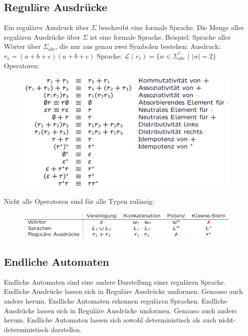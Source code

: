 \documentclass[12pt,a4paper]{article}
\begin{document}
\subsection{Reguläre Ausdrücke}
Ein regulärer Ausdruck über $\varSigma$ beschreibt eine formale Sprache.\newline
Die Menge aller regulären Ausdrücke über $\varSigma$ ist eine formale Sprache.\newline\newline
Beispiel: Sprache aller Wörter über $\varSigma_{abc}$, die nur aus genau zwei Symbolen bestehen:\newline
Ausdruck: $r_1 = (a + b + c)(a + b + c)$\newline
Sprache: $\mathcal{L}(r_1) = \{ w \in \varSigma_{abc}^*$ | $|w| = 2\}$\newpage
\noindent Operatoren:
\begin{center}
	\begin{figure}[!h]
		\includegraphics[width=\textwidth]{Bilder/RegulaereAusdruecke_Operatoren.PNG}
	\end{figure}
\end{center}
Nicht alle Operatoren sind für alle Typen zulässig:
\begin{center}
	\begin{figure}[!h]
		\includegraphics[width=\textwidth]{Bilder/Zulaessige_Operatoren.PNG}
	\end{figure}
\end{center}

\subsection{Endliche Automaten}
Endliche Automaten sind eine andere Darstellung einer regulären Sprache. Endliche Ausdrücke lassen sich in Reguläre Ausdrücke umformen. Genauso auch anders herum.\newline
Endliche Automaten erkennen regulären Sprachen. Endliche Ausdrücke lassen sich in Reguläre Ausdrücke umformen. Genauso auch anders herum.\newline
Endliche Automaten lassen sich sowohl deterministisch als auch nicht-deterministisch darstellen.
\end{document}
